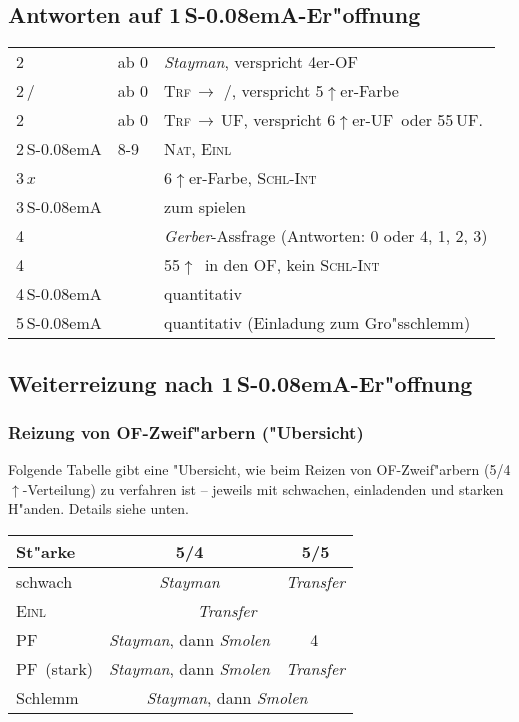 \documentclass[11pt,german,twocolumn]{scrartcl}
\renewcommand{\Cl}{{\color{ClColor}{\clubs}}}
\renewcommand{\Di}{{\color{DiColor}{\sdiamonds}}}
\renewcommand{\He}{{\color{HeColor}{\shearts}}}
\renewcommand{\Sp}{{\color{SpColor}{\spades}}}
\def\pik{\,\Sp}
\def\coe{\,\He}
\def\kar{\,\Di}
\def\tre{\,\Cl}
\def\pi{\Sp}
\def\co{\He}
\def\ra{$\rightarrow$}
\def\pl{$\uparrow$}
\def\uf{\textsf{\,UF}}
\def\ufa{\textsf{UF}}
\def\ofa{\textsf{OF}}
\def\sa{\textsf{S\kern-0.08emA}}
\def\SA{\,\sa}
\newcommand{\conv}[1]{\emph{#1}}
\def\nat{\textsc{Nat}}
\def\pf{\textsc{PF}}
\def\inv{\textsc{Einl}}
\def\xfer{\textsc{Trf}}
\def\xferto{\xfer\,\ra\,}
\def\slamint{\textsc{Schl-Int}}
\newcommand\bidins[1]%
{%
\begin{flushleft}
\begin{tabularx}{\columnwidth}{llX}%
#1
\end{tabularx}%
\end{flushleft}
}
\begin{document}
\subsection{Antworten auf 1\SA-Er"offnung}
\bidins{%
2\tre & ab 0 & \conv{Stayman}, verspricht 4er-\ofa\\
2\kar/\co & ab 0 & \xferto\coe/\pi, verspricht
5\pl{}er-Farbe\\
2\pik & ab 0 & \xferto\ufa, verspricht 6\pl{}er-\ufa\ oder
55\uf.\\
2\SA & 8-9 & \nat, \inv\\
3\,$x$ && 6\pl{}er-Farbe, \slamint{}\\
3\SA && zum spielen\\
4\tre && \conv{Gerber}-Assfrage (Antworten: 0 oder 4, 1, 2, 3)\\
4\kar && 55\pl\ in den \ofa, kein \slamint{}\\
4\SA && quantitativ\\
5\SA && quantitativ (Einladung zum Gro"sschlemm)
}

\subsection{Weiterreizung nach 1\SA-Er"offnung}

\subsubsection{Reizung von \ofa-Zweif"arbern ("Ubersicht)}

Folgende Tabelle gibt eine "Ubersicht, wie beim Reizen von
\ofa-Zweif"arbern (5/4\pl-Verteilung) zu verfahren ist -- jeweils mit
schwachen, einladenden und starken H"anden.  Details siehe unten.

\begin{tabular}[t]{|l|c|c|}
\hline
\textbf{St"arke} & \textbf{5/4} & \textbf{5/5}\\
\hline
\hline
schwach & \conv{Stayman} & \conv{Transfer}\\
\hline
\inv & \multicolumn{2}{c|}{\conv{Transfer}}\\
\hline
\pf & \conv{Stayman}, dann \conv{Smolen} & 4\kar\\
\hline
\pf\ (stark) & \conv{Stayman}, dann \conv{Smolen} & \conv{Transfer}\\
\hline
Schlemm & \multicolumn{2}{c|}{\conv{Stayman}, dann \conv{Smolen}}\\
\hline
\end{tabular}
\end{document}
